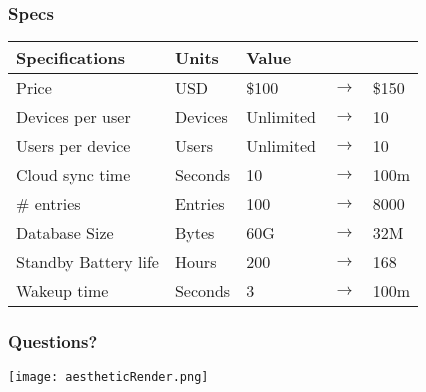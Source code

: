 \documentclass{beamer}
\begin{document}
\begin{frame}
  \frametitle{Specs}
  \begin{table}
    \centering
    \begin{tabular}{lllll}
      \hline
      Specifications                & Units   & \multicolumn{3}{l}{Value} \\
      \hline
      Price                & USD     & \$100     & $\rightarrow$ & \$150 \\
      Devices per user     & Devices & Unlimited & $\rightarrow$ & 10    \\
      Users per device     & Users   & Unlimited & $\rightarrow$ & 10    \\
      Cloud sync time      & Seconds & 10        & $\rightarrow$ & 100m  \\
      \# entries           & Entries & 100       & $\rightarrow$ & 8000  \\
      Database Size        & Bytes   & 60G       & $\rightarrow$ & 32M   \\
      Standby Battery life & Hours   & 200       & $\rightarrow$ & 168    \\
      Wakeup time          & Seconds & 3         & $\rightarrow$ & 100m  \\
      \hline
    \end{tabular}
  \end{table}
\end{frame}

\begin{frame}
  \frametitle{Questions?}
    \centering
    \texttt{[image: aestheticRender.png]}
\end{frame}
\end{document}
